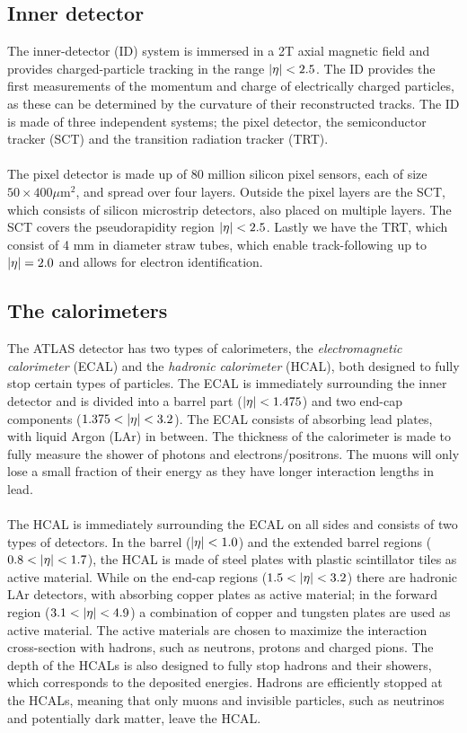 \documentclass[12pt, a4paper]{book}
\begin{document}
\subsection{Inner detector}\label{sec:ID} 
The inner-detector (ID) system is immersed in a 2T axial magnetic field and provides charged-particle tracking in the range $\abs{\eta}<2.5$. The ID provides the first measurements of the 
momentum and charge of electrically charged particles, as these can be determined by the curvature of their reconstructed tracks. 
The ID is made of three independent systems; the pixel detector, the semiconductor tracker (SCT) and 
the transition radiation tracker (TRT). \\
\\The pixel detector is made up of 80 million silicon pixel sensors, each of size $50\times400\mu$m$^2$, %
and spread over four layers. Outside the pixel layers 
are the SCT, which consists of silicon microstrip detectors, also placed on multiple layers. The SCT covers the pseudorapidity region $\abs{\eta}<2.5$. Lastly we have the TRT, 
which consist of 4 mm in diameter straw tubes, which enable track-following up to $\abs{\eta}=2.0$ and allows for electron identification. 

\subsection{The calorimeters}\label{sec:calories}
The ATLAS detector has two types of calorimeters, the \textit{electromagnetic calorimeter} (ECAL) and the \textit{hadronic calorimeter} (HCAL), both designed to fully stop certain types of particles. 
The ECAL is immediately surrounding the inner detector and is divided into a barrel part ($\abs{\eta}<1.475$) and two end-cap components ($1.375<\abs{\eta}<3.2$). 
The ECAL consists of absorbing lead plates, with liquid Argon (LAr) in between. The thickness of the calorimeter is made to fully measure the shower of photons and electrons/positrons. The muons will only lose 
a small fraction of their energy as they have longer interaction lengths in lead.\\
\\The HCAL is immediately surrounding the ECAL on all sides and consists of two types of detectors. In the barrel ($\abs{\eta}<1.0$) and the extended barrel regions ($0.8<\abs{\eta}<1.7$), the HCAL is made of 
steel plates with plastic scintillator tiles as active material. While on the end-cap regions ($1.5<\abs{\eta}<3.2$) there are hadronic LAr detectors, with absorbing copper plates as active material; in the 
forward region ($3.1<\abs{\eta}<4.9$) a combination of copper and tungsten plates are used as active material. The active materials are chosen to maximize the interaction cross-section with hadrons, such as neutrons, 
protons and charged pions. The depth of the HCALs is also designed to fully stop hadrons and their showers, which corresponds to the deposited energies. Hadrons are efficiently stopped at the HCALs, meaning that only 
muons and invisible particles, such as neutrinos and potentially dark matter, leave the HCAL.
\end{document}
